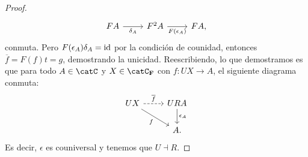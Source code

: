 \begin{proof}
\begin{equation*}
\begin{tikzcd}
      FA\ar[swap]{r}{\delta_A} & F^2A\ar[swap]{r}{F(\epsilon_A)} & FA,
    \end{tikzcd}
  \end{equation*}
  conmuta. Pero $F(\epsilon_A)\delta_A=\operatorname{id}$ por la condición de counidad, entonces $\overline{f} = F(f)t = g$, demostrando la unicidad.
  Reescribiendo, lo que demostramos es que para todo $A\in\catC$ y $X\in\catC_\textbf{F}$ con $f\colon UX\to A$, el siguiente diagrama conmuta:
  \begin{equation*}
    \begin{tikzcd}
      UX\ar[swap]{rd}{f}\ar[dashed]{r}{\overline{f}} & URA\ar{d}{\epsilon_A} \\
      & A.
    \end{tikzcd}
  \end{equation*}
  Es decir, $\epsilon$ es couniversal y tenemos que $U\dashv R$.
\end{proof}

